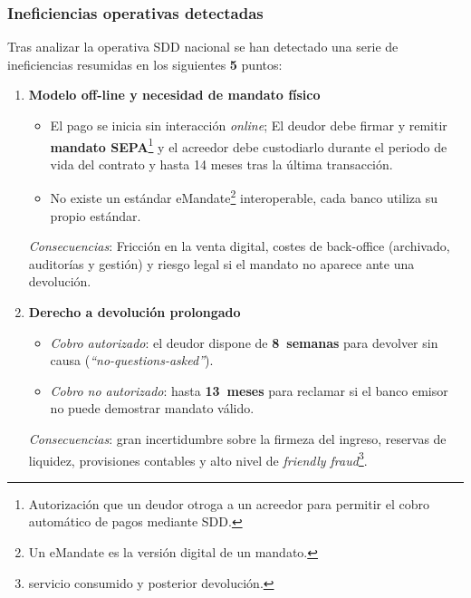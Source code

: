 \subsubsection{Ineficiencias operativas detectadas}

Tras analizar la operativa SDD nacional se han detectado una serie de ineficiencias resumidas en los siguientes \textbf{5} puntos:
\begin{enumerate}[label=\textbf{\arabic*.}, leftmargin=0.75cm]
  \item \textbf{Modelo off-line y necesidad de mandato físico}\\
        \begin{itemize}[leftmargin=0.45cm]
            \item El pago se inicia sin interacción \emph{online}; El deudor debe firmar y remitir \textbf{mandato SEPA}\footnote{Autorización que un deudor otroga a un acreedor para permitir el cobro automático de pagos mediante SDD.} y el acreedor debe custodiarlo durante el periodo de vida del contrato y hasta 14 meses tras la última transacción.
            \item No existe un estándar eMandate\footnote{Un eMandate es la versión digital de un mandato.} interoperable, cada banco utiliza su propio estándar.
        \end{itemize}
        \vspace{-0.1cm}
        \textit{Consecuencias}: Fricción en la venta digital, costes de back-office (archivado, auditorías y gestión) y riesgo legal si el mandato no aparece ante una devolución.

  \item \textbf{Derecho a devolución prolongado}\\
        \begin{itemize}[leftmargin=0.45cm]
            \item \emph{Cobro autorizado}: el deudor dispone de \textbf{8~semanas} para devolver sin causa (\emph{“no-questions-asked”}).%
            \item \emph{Cobro no autorizado}: hasta \textbf{13~meses} para reclamar si el banco emisor no puede demostrar mandato válido.%
        \end{itemize}
        \vspace{-0.1cm}
        \textit{Consecuencias}: gran incertidumbre sobre la firmeza del ingreso, reservas de liquidez, provisiones contables y alto nivel de \emph{friendly fraud}\footnote{servicio consumido y posterior devolución.}.


\end{enumerate}
